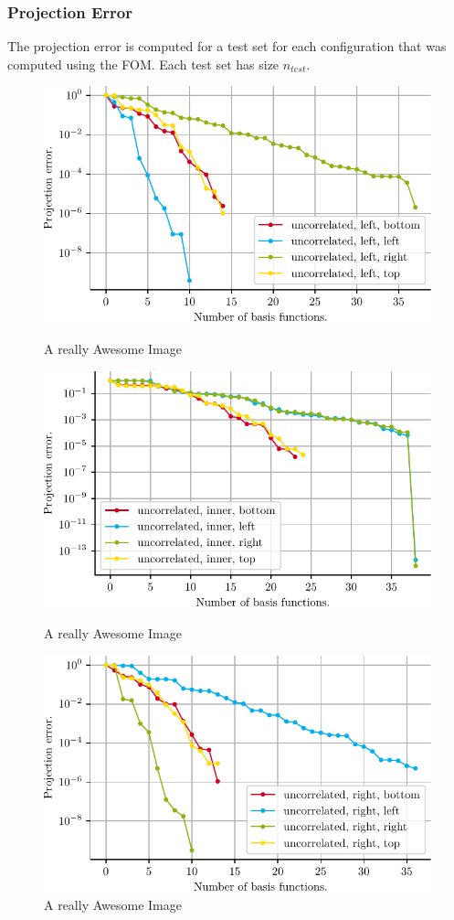 \documentclass[a4paper]{eccomas_paper-2024}
\begin{document}
\subsubsection{Projection Error}
The projection error is computed for a test set for each configuration that was computed
using the FOM. Each test set has size $n_{test}$.

\begin{figure}[!htb]
  \includegraphics[width=\linewidth]{../figures/beam/fig_proj_error_left.pdf}
  \caption{A really Awesome Image}\label{fig:proj_error_left}
\endminipage\hfill
{}
  \includegraphics[width=\linewidth]{../figures/beam/fig_proj_error_inner.pdf}
  \caption{A really Awesome Image}\label{fig:proj_error_inner}
\endminipage\hfill
{}%
  \includegraphics[width=\linewidth]{../figures/beam/fig_proj_error_right.pdf}
  \caption{A really Awesome Image}\label{fig:proj_error_right}
\endminipage
\end{figure}
\end{document}
